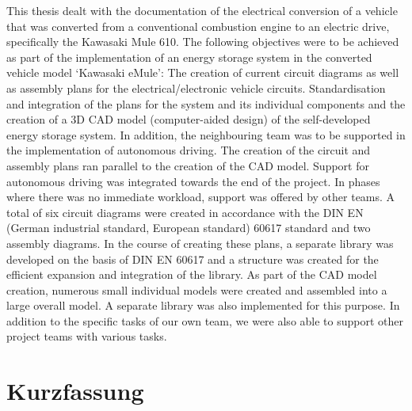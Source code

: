 This thesis dealt with the documentation of the electrical conversion of a vehicle that was converted from a conventional combustion engine to an electric drive, specifically the Kawasaki Mule 610. The following objectives were to be achieved as part of the implementation of an energy storage system in the converted vehicle model ‘Kawasaki eMule’: The creation of current circuit diagrams as well as assembly plans for the electrical/electronic vehicle circuits. Standardisation and integration of the plans for the system and its individual components and the creation of a 3D CAD model (computer-aided design) of the self-developed energy storage system. In addition, the neighbouring team was to be supported in the implementation of autonomous driving. \newline 
The creation of the circuit and assembly plans ran parallel to the creation of the CAD model. Support for autonomous driving was integrated towards the end of the project.
In phases where there was no immediate workload, support was offered by other teams.\newline
A total of six circuit diagrams were created in accordance with the DIN EN (German industrial standard, European standard) 60617 standard and two assembly diagrams. In the course of creating these plans, a separate library was developed on the basis of DIN EN 60617 and a structure was created for the efficient expansion and integration of the library. As part of the CAD model creation, numerous small individual models were created and assembled into a large overall model. A separate library was also implemented for this purpose. In addition to the specific tasks of our own team, we were also able to support other project teams with various tasks.



\chapter*{Kurzfassung} %

